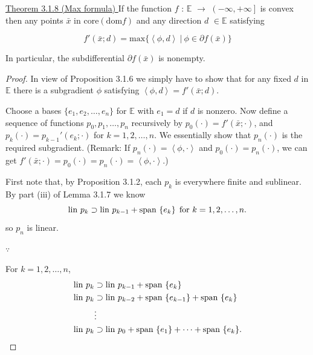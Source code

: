 \documentclass[a4paper,11pt]{jsarticle}
\begin{document}
\begin{itembox}[l]{\underline{Theorem 3.1.8 (Max formula) }}
  If the function $f$ : $\mathbb{E}$ $\to$ $ \left ( -\infty ,+\infty \right ] $ is convex then any points $\bar{x}$ in $\text{core}(\text{dom}f)$ and any direction $d$ $\in \mathbb{E}$ satisfying

  \begin{equation}
    f'(\bar{x};d) = \text{max}\{\left\langle \phi , d\right\rangle \:|\: \phi \in \partial f(\bar{x})\} \tag*{(3.1.9)}
  \end{equation}

  In particular, the subdifferential $\partial f(\bar{x})$ is nonempty.
\end{itembox}

\begin{proof}
  In view of Proposition 3.1.6 we simply have to show that for  any fixed $d$ in $\mathbb{E}$ there is a subgradient $\phi$ satisfying $\left\langle \phi , d\right\rangle = f'(\bar{x};d)$.

  Choose a bases $\{e_1,e_2,\dots,e_n\}$ for $\mathbb{E}$ with $e_1=d$ if $d$ is nonzero. Now define a sequence of functions $p_0,p_1,\dots,p_n$ recursively by $p_0(\cdot)=f'(\bar{x};\cdot)$, and $p_k(\cdot)=p_{k-1}'(e_k;\cdot)$ for $k=1,2,\dots,n$. We essentially show that $p_n(\cdot)$ is the required subgradient. (Remark: If $p_n(\cdot) = \left\langle \phi ,\cdot \right\rangle$ and $p_0(\cdot) = p_n(\cdot)$, we can get $f'(\bar{x};\cdot) = p_0(\cdot) = p_n(\cdot) = \left\langle \phi ,\cdot \right\rangle $.)

  First note that, by Proposition 3.1.2, each $p_k$ is everywhere finite and sublinear. By part (iii) of Lemma 3.1.7 we know
  \begin{equation}
    \text{lin } p_k \supset \text{lin } p_{k-1} + \text{span }\{{e_k}\} \:\:\text{for $k = 1,2,\dots,n$.} \notag
  \end{equation}
  so $p_n$ is linear.

  $\because$

  For $k = 1,2,\dots,n$,
  \begin{align}
    \text{lin } p_k &\supset \text{lin } p_{k-1} + \text{span }\{{e_k}\} \notag \\
    \text{lin } p_k &\supset \text{lin } p_{k-2} + \text{span }\{{e_{k-1}}\} + \text{span }\{{e_k}\} \notag \\
    &\vdots \notag \\
    \text{lin } p_k &\supset \text{lin } p_0 + \text{span }\{{e_{1}}\}+ \dots + \text{span }\{{e_k}\} \notag.
  \end{align}


\end{proof}
\end{document}
